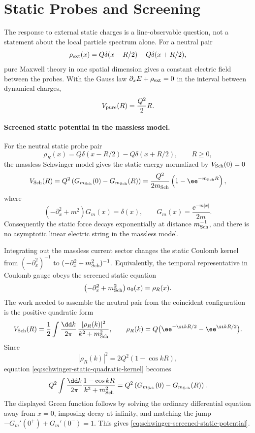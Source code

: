 \section{Static Probes and Screening}

The response to external static charges is a line-observable question, not a
statement about the local particle spectrum alone.  For a neutral pair
\[
  \rho_{\rm ext}(x)
  =
  Q\delta(x-R/2)-Q\delta(x+R/2),
\]
pure Maxwell theory in one spatial dimension gives a constant electric field
between the probes.  With the Gauss law \(\partial_xE+\rho_{\rm ext}=0\) in
the interval between dynamical charges,
\[
  V_{\rm pure}(R)=\frac{Q^2}{2}R .
\]

\paragraph{Screened static potential in the massless model.}
For the neutral static probe pair
\[
  \rho_R(x)=Q\delta(x-R/2)-Q\delta(x+R/2),
  \qquad R\ge0,
\]
the massless Schwinger model gives the static energy normalized by
\(V_{\rm Sch}(0)=0\)
\begin{equation}
  V_{\rm Sch}(R)
  =
  Q^2\left(G_{m_{\rm Sch}}(0)-G_{m_{\rm Sch}}(R)\right)
  =
  \frac{Q^2}{2m_{\rm Sch}}
  \left(1-\ee^{-m_{\rm Sch}R}\right),
  \label{eq:schwinger-screened-static-potential}
\end{equation}
where
\[
  \left(-\partial_x^2+m^2\right)G_m(x)=\delta(x),
  \qquad
  G_m(x)=\frac{\ee^{-m|x|}}{2m}.
\]
Consequently the static force decays exponentially at distance
\(m_{\rm Sch}^{-1}\), and there is no asymptotic linear electric string in
the massless model.

Integrating out the massless current sector changes the static Coulomb kernel
from \((-\partial_x^2)^{-1}\) to
\((-\partial_x^2+m_{\rm Sch}^2)^{-1}\).  Equivalently, the temporal
representative in Coulomb gauge obeys the screened static equation
\[
  \left(-\partial_x^2+m_{\rm Sch}^2\right)a_0(x)=\rho_R(x).
\]
The work needed to assemble the neutral pair from the coincident
configuration is the positive quadratic form
\begin{equation}
  V_{\rm Sch}(R)
  =
  \frac12\int\frac{\dd k}{2\pi}\,
  \frac{|\rho_R(k)|^2}{k^2+m_{\rm Sch}^2},
  \qquad
  \rho_R(k)=Q\bigl(\ee^{-\ii kR/2}-\ee^{\ii kR/2}\bigr).
  \label{eq:schwinger-static-quadratic-kernel}
\end{equation}
Since
\[
  |\rho_R(k)|^2=2Q^2(1-\cos kR),
\]
equation \eqref{eq:schwinger-static-quadratic-kernel} becomes
\[
  Q^2\int\frac{\dd k}{2\pi}
  \frac{1-\cos kR}{k^2+m_{\rm Sch}^2}
  =
  Q^2\left(G_{m_{\rm Sch}}(0)-G_{m_{\rm Sch}}(R)\right).
\]
The displayed Green function follows by solving the ordinary differential
equation away from \(x=0\), imposing decay at infinity, and matching the jump
\(-G_m'(0^+)+G_m'(0^-)=1\).  This gives
\eqref{eq:schwinger-screened-static-potential}.

